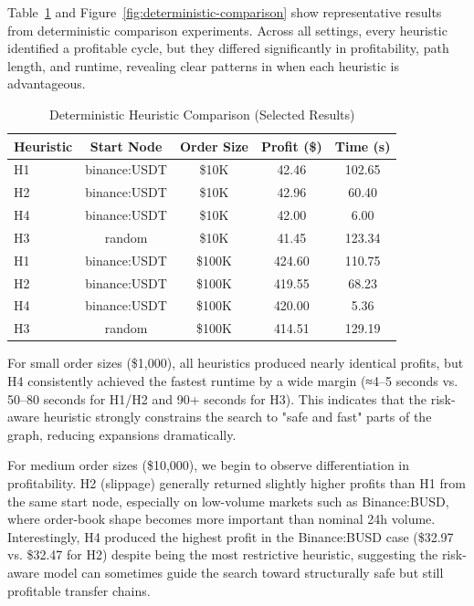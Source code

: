 \documentclass[11pt]{article}
\begin{document}
Table~\ref{tab:deterministic-results} and Figure~\ref{fig:deterministic-comparison} show representative results from deterministic comparison experiments. Across all settings, every heuristic identified a profitable cycle, but they differed significantly in profitability, path length, and runtime, revealing clear patterns in when each heuristic is advantageous.

\begin{table}[h]
\centering
\caption{Deterministic Heuristic Comparison (Selected Results)}
\label{tab:deterministic-results}
\small
\begin{tabular}{lcccc}
\toprule
\textbf{Heuristic} & \textbf{Start Node} & \textbf{Order Size} & \textbf{Profit (\$)} & \textbf{Time (s)} \\
\midrule
H1 & binance:USDT & \$10K & 42.46 & 102.65 \\
H2 & binance:USDT & \$10K & 42.96 & 60.40 \\
H4 & binance:USDT & \$10K & 42.00 & 6.00 \\
H3 & random & \$10K & 41.45 & 123.34 \\
\midrule
H1 & binance:USDT & \$100K & 424.60 & 110.75 \\
H2 & binance:USDT & \$100K & 419.55 & 68.23 \\
H4 & binance:USDT & \$100K & 420.00 & 5.36 \\
H3 & random & \$100K & 414.51 & 129.19 \\
\bottomrule
\end{tabular}
\end{table}

For small order sizes (\$1,000), all heuristics produced nearly identical profits, but H4 consistently achieved the fastest runtime by a wide margin (≈4--5 seconds vs. 50--80 seconds for H1/H2 and 90+ seconds for H3). This indicates that the risk-aware heuristic strongly constrains the search to "safe and fast" parts of the graph, reducing expansions dramatically.

For medium order sizes (\$10,000), we begin to observe differentiation in profitability. H2 (slippage) generally returned slightly higher profits than H1 from the same start node, especially on low-volume markets such as Binance:BUSD, where order-book shape becomes more important than nominal 24h volume. Interestingly, H4 produced the highest profit in the Binance:BUSD case (\$32.97 vs. \$32.47 for H2) despite being the most restrictive heuristic, suggesting the risk-aware model can sometimes guide the search toward structurally safe but still profitable transfer chains.
\end{document}

